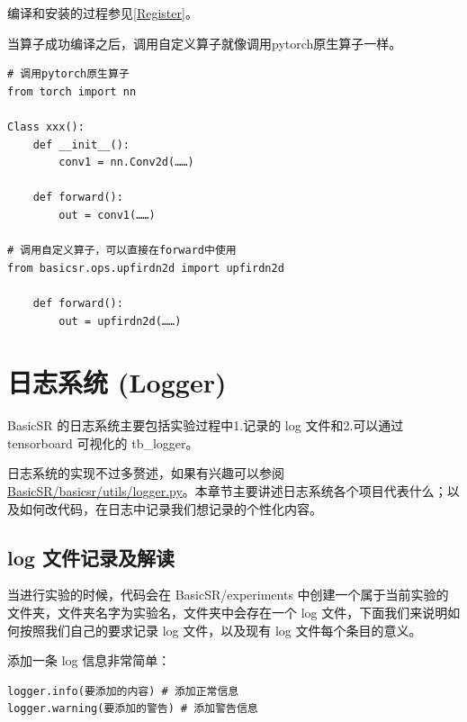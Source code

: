 \documentclass[../main.tex]{subfiles}
\begin{document}
\begin{note} %
    编译和安装的过程参见\ref{Register}。
\end{note}

当算子成功编译之后，调用自定义算子就像调用pytorch原生算子一样。


\begin{verbatim}
# 调用pytorch原生算子
from torch import nn

Class xxx():
    def __init__():
        conv1 = nn.Conv2d(……)

    def forward():
        out = conv1(……)

# 调用自定义算子，可以直接在forward中使用
from basicsr.ops.upfirdn2d import upfirdn2d

    def forward():
        out = upfirdn2d(……)

\end{verbatim}


\section{日志系统 (Logger)} \label{code_structure:logger}

BasicSR 的日志系统主要包括实验过程中1.记录的 log 文件和2.可以通过 tensorboard 可视化的 tb\_logger。

日志系统的实现不过多赘述，如果有兴趣可以参阅 \href{https://github.com/XPixelGroup/BasicSR/blob/master/basicsr/utils/logger.py}{BasicSR/basicsr/utils/logger.py}。本章节主要讲述日志系统各个项目代表什么；以及如何改代码，在日志中记录我们想记录的个性化内容。

\subsection{log 文件记录及解读}

当进行实验的时候，代码会在 BasicSR/experiments 中创建一个属于当前实验的文件夹，文件夹名字为实验名，文件夹中会存在一个 log 文件，下面我们来说明如何按照我们自己的要求记录 log 文件，以及现有 log 文件每个条目的意义。

\begin{hl} %

    添加一条 log 信息非常简单：

    \begin{verbatim}
logger.info(要添加的内容) # 添加正常信息
logger.warning(要添加的警告) # 添加警告信息
\end{verbatim}
\end{hl}
\end{document}
